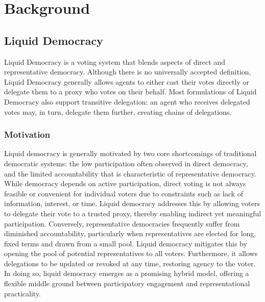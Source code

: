 \graphicspath{{../figures/}}

\chapter{Background}
\label{chap:background}

\section{Liquid Democracy}

Liquid Democracy is a voting system that blends aspects of direct and representative democracy. Although there is no universally accepted definition, Liquid Democracy generally allows agents to either cast their votes directly or delegate them to a proxy who votes on their behalf. Most formulations of Liquid Democracy also support transitive delegation: an agent who receives delegated votes may, in turn, delegate them further, creating chains of delegations. \cite{degraveResolvingMultiproxyTransitive2014, boldiViscousDemocracySocial2011, revel2022liquid, bersetcheGeneralizingLiquidDemocracy2022}

\subsection{Motivation}

Liquid democracy is generally motivated by two core shortcomings of traditional democratic systems: the low participation often observed in direct democracy, and the limited accountability that is characteristic of representative democracy. \cite{fordDelegativeDemocracy2002, brillInteractiveDemocracy2018} While democracy depends on active participation, direct voting is not always feasible or convenient for individual voters due to constraints such as lack of information, interest, or time. Liquid democracy addresses this by allowing voters to delegate their vote to a trusted proxy, thereby enabling indirect yet meaningful participation. Conversely, representative democracies frequently suffer from diminished accountability, particularly when representatives are elected for long, fixed terms and drawn from a small pool. Liquid democracy mitigates this by opening the pool of potential representatives to all voters. Furthermore, it allows delegations to be updated or revoked at any time, restoring agency to the voter. \cite{brillInteractiveDemocracy2018} In doing so, liquid democracy emerges as a promising hybrid model, offering a flexible middle ground between participatory engagement and representational practicality.

